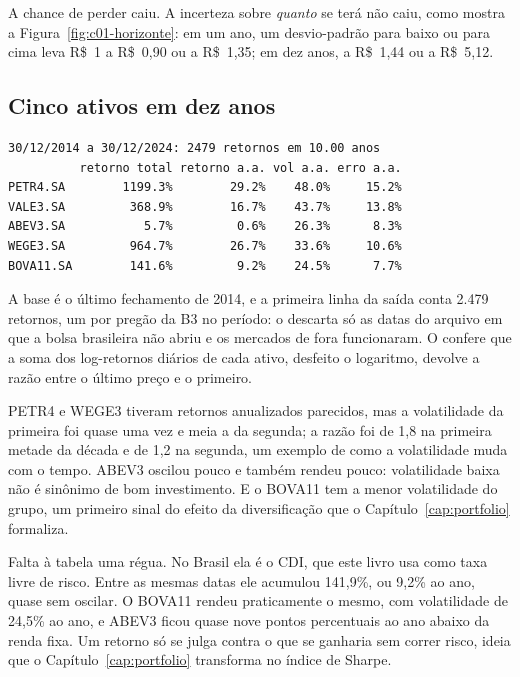 
A chance de perder caiu. A incerteza sobre \emph{quanto} se terá não caiu, como mostra a Figura~\ref{fig:c01-horizonte}: em um ano, um desvio-padrão para baixo ou para cima leva R\$~1 a R\$~0,90 ou a R\$~1,35; em dez anos, a R\$~1,44 ou a R\$~5,12.

\Needspace{70mm}
\subsection{Cinco ativos em dez anos}


\begin{lstlisting}[style=saida]
30/12/2014 a 30/12/2024: 2479 retornos em 10.00 anos
          retorno total retorno a.a. vol a.a. erro a.a.
PETR4.SA        1199.3%        29.2%    48.0%     15.2%
VALE3.SA         368.9%        16.7%    43.7%     13.8%
ABEV3.SA           5.7%         0.6%    26.3%      8.3%
WEGE3.SA         964.7%        26.7%    33.6%     10.6%
BOVA11.SA        141.6%         9.2%    24.5%      7.7%
\end{lstlisting}

A base é o último fechamento de 2014, e a primeira linha da saída conta 2.479 retornos, um por pregão da B3 no período: o  descarta só as datas do arquivo em que a bolsa brasileira não abriu e os mercados de fora funcionaram. O  confere que a soma dos log-retornos diários de cada ativo, desfeito o logaritmo, devolve a razão entre o último preço e o primeiro.

PETR4 e WEGE3 tiveram retornos anualizados parecidos, mas a volatilidade da primeira foi quase uma vez e meia a da segunda; a razão foi de 1,8 na primeira metade da década e de 1,2 na segunda, um exemplo de como a volatilidade muda com o tempo. ABEV3 oscilou pouco e também rendeu pouco: volatilidade baixa não é sinônimo de bom investimento. E o BOVA11 tem a menor volatilidade do grupo, um primeiro sinal do efeito da diversificação que o Capítulo~\ref{cap:portfolio} formaliza.

Falta à tabela uma régua. No Brasil ela é o CDI, que este livro usa como taxa livre de risco. Entre as mesmas datas ele acumulou 141,9\%, ou 9,2\% ao ano, quase sem oscilar. O BOVA11 rendeu praticamente o mesmo, com volatilidade de 24,5\% ao ano, e ABEV3 ficou quase nove pontos percentuais ao ano abaixo da renda fixa. Um retorno só se julga contra o que se ganharia sem correr risco, ideia que o Capítulo~\ref{cap:portfolio} transforma no índice de Sharpe.

